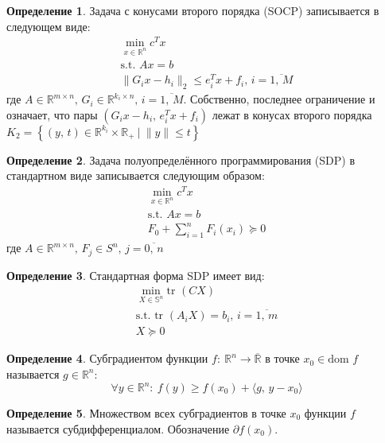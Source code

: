 \documentclass[a4paper,12pt]{article}
\renewcommand{\leq}{\ensuremath{\leqslant}}
\renewcommand{\geq}{\ensuremath{\geqslant}}
\theoremstyle{plain}
\theoremstyle{definition}
\newtheorem{definition}{Определение}[section]
\theoremstyle{remark}
\begin{document}
\begin{definition}
	Задача с конусами второго порядка (SOCP) записывается в следующем виде:
	\begin{align*}
		\min_{x \in \mathbb{R}^n} c^Tx \\
		\text{s.t. }Ax = b             \\
		\|G_ix - h_i\|_2 \leq e_i^Tx + f_i,\, i = \overline{1,\, M}
	\end{align*}
	где $A \in \mathbb{R}^{m \times n},\, G_i \in \mathbb{R}^{k_i \times n},\, i = \overline{1,\, M}$. Собственно, последнее ограничение и означает, что пары $(G_ix - h_i,\, e_i^Tx + f_i)$ лежат в конусах второго порядка $K_2 = \left\{ (y,\, t) \in \mathbb{R}^{k_i} \times \mathbb{R}_+ \:\vert\: \|y\| \leq t\right\}$
\end{definition}

\begin{definition}
	Задача полуопределённого программирования (SDP) в стандартном виде записывается следующим образом:
	\begin{align*}
		\min_{x \in \mathbb{R}^n} c^Tx \\
		\text{s.t. }Ax = b             \\
		F_0 + \sum_{i = 1}^n F_i(x_i) \succeq 0
	\end{align*}
	где $A \in \mathbb{R}^{m \times n},\, F_j \in S^n,\, j = \overline{0,\, n}$
\end{definition}

\begin{definition}
	Стандартная форма SDP имеет вид:
	\begin{align*}
		\min_{X \in \mathbb{S}^n} \text{tr }(CX)                    \\
		\text{s.t. } \text{tr }(A_iX) = b_i,\, i = \overline{1,\,m} \\
		X \succeq 0
	\end{align*}
\end{definition}

\begin{definition}
	Субградиентом функции $f :\: \mathbb{R}^n \to \overline{\mathbb{R}}$ в точке $x_0 \in \text{dom } f$ называется $g \in \mathbb{R}^n$:
	\[
		\forall y \in \mathbb{R}^n :\: f(y) \geq f(x_0) + \langle g,\, y - x_0\rangle
	\]
\end{definition}

\begin{definition}
	Множеством всех субградиентов в точке $x_0$ функции $f$ называется субдифференциалом. Обозначение $\partial f(x_0)$.
\end{definition}
\end{document}
